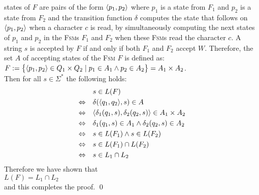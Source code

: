 states of $F$ are pairs of the form $\pair(p_1,p_2)$ where $p_1$ is a state from $F_1$ and $p_2$ is a state from
$F_2$ and the transition function $\delta$ computes the state that follows on
$\pair(p_1,p_2)$ when a character $c$ is read, by simultaneously computing the next states of $p_1$ and $p_2$
in the \textsc{Fsm}s $F_1$ and $F_2$ when these \textsc{Fsm}s read the character $c$. 
A string $s$ is accepted by $F$ if and only if
both $F_1$ and  $F_2$ accept $W$.  Therefore, the set $A$ of accepting states of the \textsc{Fsm} $F$ is defined as:
\\[0.2cm]
\hspace*{1.3cm}
$F := \bigl\{ \pair(p_1,p_2) \in Q_1 \times Q_2 \mid p_1 \in A_1 \wedge p_2 \in A_2 \bigr\} = A_1 \times A_2$.
\\[0.2cm]
Then for all $s \in \Sigma^*$ the following holds:
$$
\begin{array}[t]{cl}
                & s \in L(F)                                                           \\[0.1cm]
\Leftrightarrow & \delta(\pair(q_1,q_2), s) \in A                                      \\[0.1cm]
\Leftrightarrow & \langle \delta_1(q_1,s), \delta_2(q_2, s) \rangle \in A_1 \times A_2 \\[0.1cm]
\Leftrightarrow & \delta_1(q_1,s) \in A_1 \wedge  \delta_2(q_2, s) \in A_2             \\[0.1cm]
\Leftrightarrow & s \in L(F_1) \wedge  s \in L(F_2)                                    \\[0.1cm]
\Leftrightarrow & s \in L(F_1) \cap L(F_2)                                             \\[0.1cm]
\Leftrightarrow & s \in L_1 \cap L_2                                                 
\end{array}
$$
Therefore we have shown that
\\[0.2cm]
\hspace*{1.3cm}
 $L(F) = L_1 \cap L_2$ 
\\[0.2cm]
and this completes the proof. \qed


